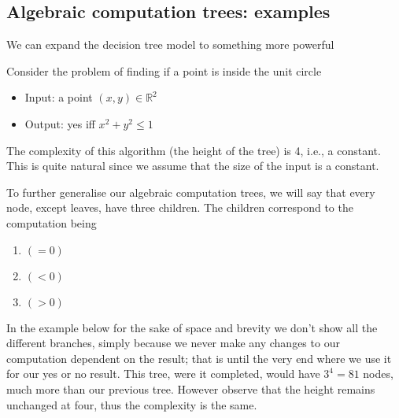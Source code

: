 \subsection{Algebraic computation trees: examples}
We can expand the decision tree model to something more powerful

Consider the problem of finding if a point is inside the unit circle
\begin{itemize}
    \item Input: a point $(x,y) \in \mathbb{R}^2$
    \item Output: yes iff $x^2 + y^2 \leq 1$
\end{itemize}
The complexity of this algorithm (the height of the tree) is 4, i.e., a constant.
This is quite natural since we assume that the size of the input is a constant.
\begin{center}
\end{center}

To further generalise our algebraic computation trees,
we will say that every node, except leaves, have three children.
The children correspond to the computation being
\begin{enumerate}
    \item $(= 0)$
    \item $(< 0)$
    \item $(> 0)$
\end{enumerate}
In the example below for the sake of space and brevity we don't show all the different branches,
simply because we never make any changes to our computation dependent on the result;
that is until the very end where we use it for our yes or no result.
This tree, were it completed, would have $3^4 = 81$ nodes,
much more than our previous tree.
However observe that the height remains unchanged at four,
thus the complexity is the same.


